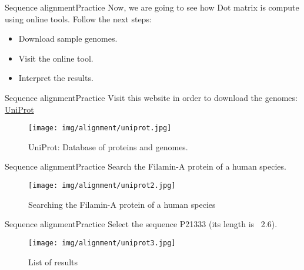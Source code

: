 \documentclass[10pt]{beamer}
\newcommand{\1}{
	\setbeamertemplate{background}{
		\texttt{[image: img/1]}
		\tikz[overlay] \fill[fill opacity=0.75,fill=white] (0,0) rectangle (-\paperwidth,\paperheight);
	}
}
\begin{document}
\begin{frame}{Sequence alignment}{Practice}
Now, we are going to see how Dot matrix is compute using online tools. Follow the next steps:
\begin{itemize}
    \item Download sample genomes.
    \item Visit the online tool.
    \item Interpret the results.
\end{itemize}
\end{frame}

\begin{frame}{Sequence alignment}{Practice}
Visit this website in order to download the genomes: \href{https://www.uniprot.org/}{UniProt} 
\begin{figure}[]
 \centering
    \texttt{[image: img/alignment/uniprot.jpg]}
    \label{img:uniprot}
    \caption{UniProt: Database of proteins and genomes.}
\end{figure}
\end{frame}

\begin{frame}{Sequence alignment}{Practice}
Search the Filamin-A protein of a human species. 
\begin{figure}[]
 \centering
    \texttt{[image: img/alignment/uniprot2.jpg]}
    \label{img:uniprot2}
    \caption{Searching the Filamin-A protein of a human  species}
\end{figure}
\end{frame}

\begin{frame}{Sequence alignment}{Practice}
Select the sequence P21333 (its length is \string ~2.6). 
\begin{figure}[]
 \centering
    \texttt{[image: img/alignment/uniprot3.jpg]}
    \label{img:uniprot2}
    \caption{List of results}
\end{figure}
\end{frame}
\end{document}

